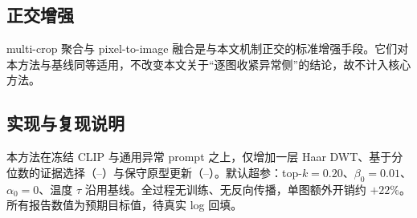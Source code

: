 \subsection{正交增强}
multi-crop 聚合与 pixel-to-image 融合是与本文机制正交的标准增强手段。它们对本方法与基线同等适用，不改变本文关于“逐图收紧异常侧”的结论，故不计入核心方法。

\subsection{实现与复现说明}
本方法在冻结 CLIP 与通用异常 prompt 之上，仅增加一层 Haar DWT、基于分位数的证据选择（--）与保守原型更新（--）。默认超参：top-$k=0.20$、$\beta_0=0.01$、$\alpha_0=0$、温度 $\tau$ 沿用基线。全过程无训练、无反向传播，单图额外开销约 $+22\%$。所有报告数值为预期目标值，待真实 log 回填。
